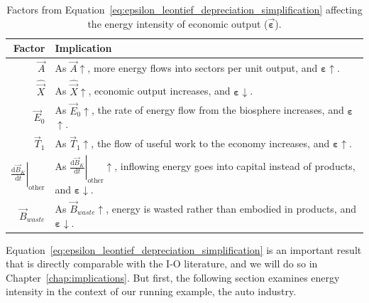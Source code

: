 \begin{table}
\caption[Factors affecting the energy intensity of economic output.]{Factors from
Equation~\ref{eq:epsilon_leontief_depreciation_simplification} 
affecting the energy intensity of economic output ($\vec{\boldsymbol{\varepsilon}}$).}
\begin{center}
  \begin{tabular}{r @{\hspace{2em}} l}
	  
    \toprule
	
    Factor & Implication \\ 
	
	\midrule
    
	$\vec{A}$ & As $\vec{A}$$\uparrow$, more energy 
	flows into sectors per unit output, 
	and $\boldsymbol{\varepsilon}$$\uparrow$.\\
	
	$\hat{\vec{X}}$ & As $\hat{\vec{X}}$$\uparrow$, economic output increases, 
	and $\boldsymbol{\varepsilon}$$\downarrow$.  \\
	
	$\vec{E}_{0}$ & As $\vec{E}_{0}$$\uparrow$, 
	the rate of energy flow from the biosphere increases, 
	and $\boldsymbol{\varepsilon}$$\uparrow$.  \\ 
	
	$\vec{T}_{1}$ & As $\vec{T}_{1}$$\uparrow$, 
	the flow of useful work to the economy increases, 
	and $\boldsymbol{\varepsilon}$$\uparrow$.  \\ 
	
	$\left. \frac{\mathrm{d}\vec{B}_{K}}{\mathrm{d}t} \right|_{\mathrm{other}}$ & 
	As $\left. \frac{\mathrm{d}\vec{B}_{K}}{\mathrm{d}t} \right|_{\mathrm{other}}$$\uparrow$, 
	inflowing energy goes into capital instead of products, 
	and $\boldsymbol{\varepsilon}$$\downarrow$. \\
	
	$\vec{B}_{waste}$ & As $\vec{B}_{waste}$$\uparrow$, 
	energy is wasted rather than embodied in products,
	and $\boldsymbol{\varepsilon}$$\downarrow$. \\

	\bottomrule
	
  \end{tabular}
\end{center}
\label{tab:embodied_energy_accumulation_factors}
\end{table}





Equation~\ref{eq:epsilon_leontief_depreciation_simplification}
is an important result that is directly comparable with the I-O literature,
and we will do so in Chapter~\ref{chap:implications}.
But first, the following section examines energy intensity 
in the context of our running example, the auto industry.

